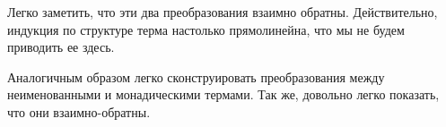 Легко заметить, что эти два преобразования взаимно обратны. Действительно, индукция по структуре терма настолько прямолинейна, что мы не будем приводить ее здесь.

Аналогичным образом легко сконструировать преобразования между неименованными и монадическими термами. Так же, довольно легко показать, что они взаимно-обратны.
